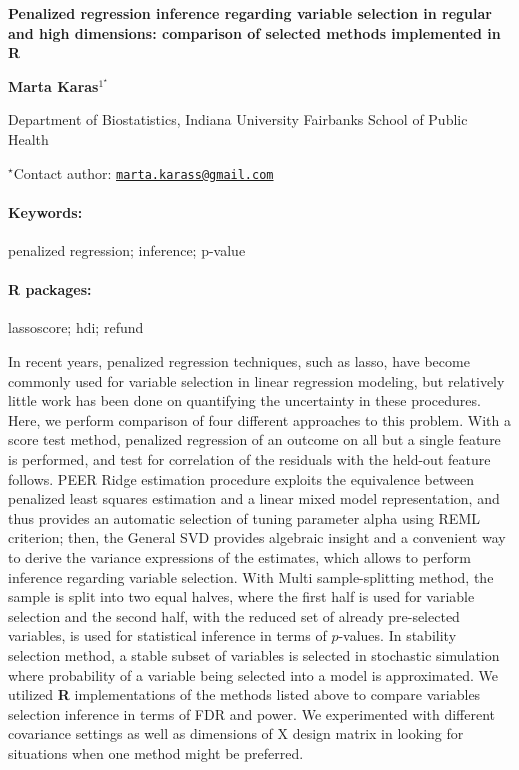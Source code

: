 \documentclass[11pt, a4paper]{article}
\renewcommand{\title}[1]{\begin{center}{\bf \LARGE #1}\end{center}}
\newcommand{\keywords}{\paragraph{Keywords:}}
\newcommand{\packages}{\paragraph{R packages:}}
\begin{document}
\pagestyle{empty}

\title{Penalized regression inference regarding variable selection in regular
and high dimensions: comparison of selected methods implemented in R}

\begin{center}
  {\bf Marta Karas$^{1^\star}$}
\end{center}

\vskip 0.3cm

\begin{affiliations}
\begin{enumerate}
\begin{minipage}{0.915\textwidth}
\centering
\item Department of Biostatistics, Indiana University Fairbanks School of
Public Health \\[-2pt]
\end{minipage}
\end{enumerate}
$^\star$Contact author: \href{mailto:marta.karass@gmail.com}{\nolinkurl{marta.karass@gmail.com}}\\
\end{affiliations}

\vskip 0.5cm

\begin{minipage}{0.915\textwidth}
\keywords penalized regression; inference; p-value
\packages lassoscore; hdi; refund
\end{minipage}

\vskip 0.8cm

In recent years, penalized regression techniques, such as lasso, have
become commonly used for variable selection in linear regression
modeling, but relatively little work has been done on quantifying the
uncertainty in these procedures. Here, we perform comparison of four
different approaches to this problem. With a score test method,
penalized regression of an outcome on all but a single feature is
performed, and test for correlation of the residuals with the held-out
feature follows. PEER Ridge estimation procedure exploits the
equivalence between penalized least squares estimation and a linear
mixed model representation, and thus provides an automatic selection of
tuning parameter alpha using REML criterion; then, the General SVD
provides algebraic insight and a convenient way to derive the variance
expressions of the estimates, which allows to perform inference
regarding variable selection. With Multi sample-splitting method, the
sample is split into two equal halves, where the first half is used for
variable selection and the second half, with the reduced set of already
pre-selected variables, is used for statistical inference in terms of
\(p\)-values. In stability selection method, a stable subset of
variables is selected in stochastic simulation where probability of a
variable being selected into a model is approximated. We utilized
\textbf{R} implementations of the methods listed above to compare
variables selection inference in terms of FDR and power. We experimented
with different covariance settings as well as dimensions of X design
matrix in looking for situations when one method might be preferred.
\end{document}
